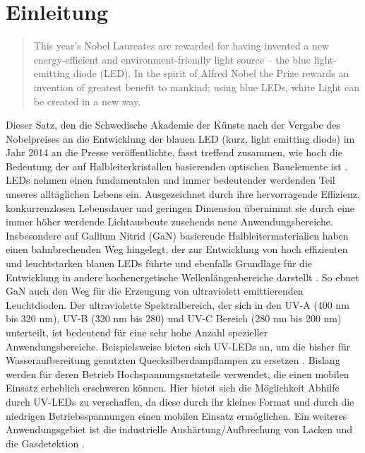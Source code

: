 
\chapter{Einleitung}
\thispagestyle{fancy}

\begin{quote}
This year’s Nobel Laureates are rewarded for having invented a new energy-efficient and environment-friendly light source – the blue light-emitting diode (LED). In the spirit of Alfred Nobel the Prize rewards an invention of greatest benefit to mankind; using blue LEDs, white Light can be created in a new way. \cite{nobelp} \end{quote}
\noindent
Dieser Satz, den die Schwedische Akademie der Künste nach der Vergabe des Nobelpreises an die Entwicklung der blauen LED (kurz, light emitting diode) im Jahr 2014 an die Presse veröffentlichte, fasst treffend zusammen, wie hoch die Bedeutung der auf Halbleiterkristallen basierenden optischen Bauelemente ist \cite{kneissl}. LEDs nehmen einen fundamentalen und immer bedeutender werdenden Teil unseres alltäglichen Lebens ein. Ausgezeichnet durch ihre hervorragende Effizienz, konkurrenzlosen Lebensdauer und geringen Dimension übernimmt sie durch eine immer höher werdende Lichtausbeute zusehends neue Anwendungsbereiche. Insbesondere auf Gallium Nitrid (GaN) basierende Halbleitermaterialien haben einen bahnbrechenden Weg hingelegt, der zur Entwicklung von hoch effizienten und leuchtstarken blauen LEDs führte und ebenfalls Grundlage für die Entwicklung in andere hochenergetische Wellenlängenbereiche darstellt \cite{risk} \cite{Shuji1999CandelaclassHI} \cite{10007979421}. So ebnet GaN auch den Weg für die Erzeugung von ultraviolett emittierenden Leuchtdioden. Der ultraviolette Spektralbereich, der sich in den UV-A (400 nm bis 320 nm), UV-B (320 nm bis 280) und UV-C Bereich (280 nm bis 200 nm) unterteilt, ist bedeutend für eine sehr hohe Anzahl spezieller Anwendungsbereiche. Beispielsweise bieten sich UV-LEDs an, um die bisher für Wasseraufbereitung genutzten Quecksilberdampflampen zu ersetzen \cite{Vilhunen2009}  \cite{WURTELE2011148}. Bislang werden für deren Betrieb Hochspannungsnetzteile verwendet, die einen mobilen Einsatz erheblich erschweren können. Hier bietet sich die Möglichkeit Abhilfe durch UV-LEDs zu verschaffen, da diese durch ihr kleines Format und durch die niedrigen Betriebsspannungen einen mobilen Einsatz ermöglichen. Ein weiteres Anwendungsgebiet ist die industrielle Aushärtung/Aufbrechung von Lacken und die Gasdetektion \cite{0268-1242-26-1-014036} \cite{LALINSKY2010152}. 
